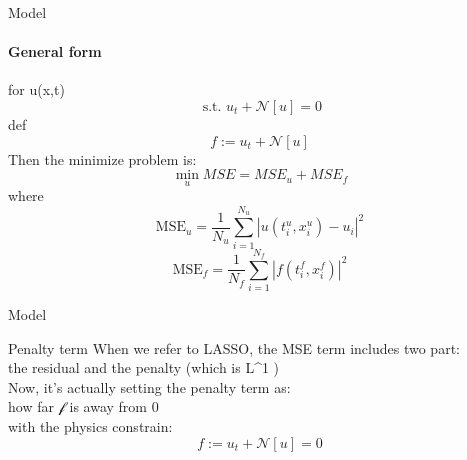 \begin{frame}{Model}
\framesubtitle{General form}
    for u(x,t)
    \begin{equation}
    \text{ s.t. } u_t + \mathcal{N}[u] = 0
    \end{equation}
    def  
    \begin{equation}
    f := u_t + \mathcal{N}[u]
    \end{equation}
    Then the minimize problem is:
    \begin{equation}
    \min\limits_{u} MSE = MSE_u + MSE_f
    \end{equation}
    where
    \begin{equation}
    \text{MSE}_u = \frac{1}{N_u} \sum_{i=1}^{N_u} | u(t_i^u, x_i^u) - u_i |^2
    \end{equation}
    \begin{equation}
    \text{MSE}_f = \frac{1}{N_f} \sum_{i=1}^{N_f} | f(t_i^f, x_i^f) |^2
    \end{equation}
\end{frame}
\begin{frame}{Model}
    \begin{block}{Penalty term}
    When we refer to LASSO, the MSE term includes two part:\\
    the residual and the penalty (which is L^1 )\\
    Now, it's actually setting the penalty term as:\\
    how far \( \mathscr{f} \)  is away from 0\\
    with the physics constrain: 
    \begin{equation}
    f := u_t + \mathcal{N}[u]=0
    \end{equation}
    \end{block}
\end{frame}

